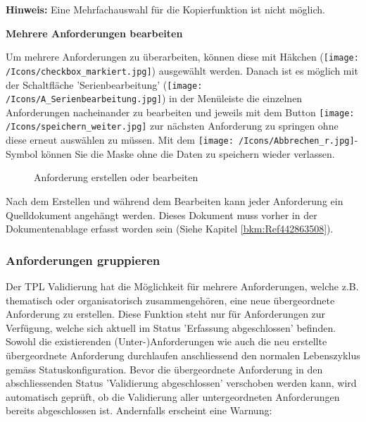 \vspace{.2cm} 

\textbf{Hinweis:} Eine Mehrfachauswahl für die Kopierfunktion ist nicht möglich.


\vspace{\baselineskip}

\textbf{Mehrere Anforderungen bearbeiten}

Um mehrere Anforderungen zu überarbeiten, können diese mit Häkchen (\texttt{[image: /Icons/checkbox\_markiert.jpg]}) ausgewählt werden. Danach ist es möglich mit der Schaltfläche 'Serienbearbeitung' (\texttt{[image: /Icons/A\_Serienbearbeitung.jpg]}) in der Menüleiste die einzelnen Anforderungen nacheinander zu bearbeiten und jeweils mit dem Button \texttt{[image: /Icons/speichern\_weiter.jpg]}  zur nächsten Anforderung zu springen ohne diese erneut auswählen zu müssen. Mit dem \texttt{[image: /Icons/Abbrechen\_r.jpg]}-Symbol  können Sie die Maske ohne die Daten zu speichern wieder verlassen.

\begin{figure}[H]
\caption{Anforderung erstellen oder bearbeiten}
\end{figure}

Nach dem Erstellen und während dem Bearbeiten kann jeder Anforderung ein Quelldokument angehängt werden. Dieses Dokument muss vorher in der Dokumentenablage erfasst worden sein (Siehe Kapitel \ref{bkm:Ref442863508}). 

\subsubsection{Anforderungen gruppieren}
\label{bkm:Ref2018121101}

Der TPL Validierung hat die Möglichkeit für mehrere Anforderungen, welche z.B. thematisch oder organisatorisch zusammengehören, eine neue übergeordnete Anforderung zu erstellen. Diese Funktion steht nur für Anforderungen zur Verfügung, welche sich aktuell im Status 'Erfassung abgeschlossen' befinden. Sowohl die existierenden (Unter-)Anforderungen wie auch die neu erstellte übergeordnete Anforderung durchlaufen anschliessend den normalen Lebenszyklus gemäss Statuskonfiguration. Bevor die übergeordnete Anforderung in den abschliessenden Status 'Validierung abgeschlossen' verschoben werden kann, wird automatisch geprüft, ob die Validierung aller untergeordneten Anforderungen bereits abgeschlossen ist. Andernfalls erscheint eine Warnung:

